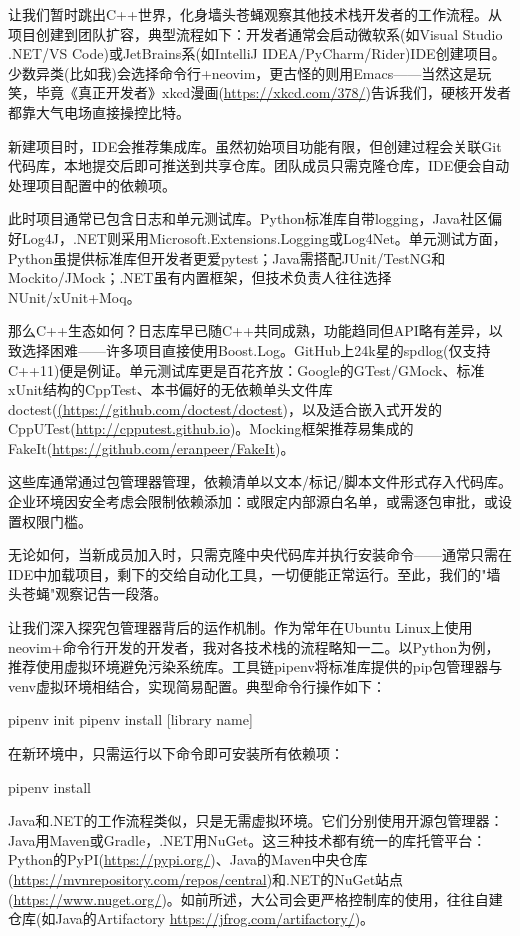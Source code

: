
让我们暂时跳出C++世界，化身墙头苍蝇观察其他技术栈开发者的工作流程。从项目创建到团队扩容，典型流程如下：开发者通常会启动微软系(如Visual Studio .NET/VS Code)或JetBrains系(如IntelliJ IDEA/PyCharm/Rider)IDE创建项目。少数异类(比如我)会选择命令行+neovim，更古怪的则用Emacs——当然这是玩笑，毕竟《真正开发者》xkcd漫画(\url{https://xkcd.com/378/})告诉我们，硬核开发者都靠大气电场直接操控比特。

新建项目时，IDE会推荐集成库。虽然初始项目功能有限，但创建过程会关联Git代码库，本地提交后即可推送到共享仓库。团队成员只需克隆仓库，IDE便会自动处理项目配置中的依赖项。

此时项目通常已包含日志和单元测试库。Python标准库自带logging，Java社区偏好Log4J，.NET则采用Microsoft.Extensions.Logging或Log4Net。单元测试方面，Python虽提供标准库但开发者更爱pytest；Java需搭配JUnit/TestNG和Mockito/JMock；.NET虽有内置框架，但技术负责人往往选择NUnit/xUnit+Moq。

那么C++生态如何？日志库早已随C++共同成熟，功能趋同但API略有差异，以致选择困难——许多项目直接使用Boost.Log。GitHub上24k星的spdlog(仅支持C++11)便是例证。单元测试库更是百花齐放：Google的GTest/GMock、标准xUnit结构的CppTest、本书偏好的无依赖单头文件库doctest(\url{(https://github.com/doctest/doctest})，以及适合嵌入式开发的CppUTest(\url{http://cpputest.github.io})。Mocking框架推荐易集成的FakeIt(\url{https://github.com/eranpeer/FakeIt})。

这些库通常通过包管理器管理，依赖清单以文本/标记/脚本文件形式存入代码库。企业环境因安全考虑会限制依赖添加：或限定内部源白名单，或需逐包审批，或设置权限门槛。

无论如何，当新成员加入时，只需克隆中央代码库并执行安装命令——通常只需在IDE中加载项目，剩下的交给自动化工具，一切便能正常运行。至此，我们的"墙头苍蝇"观察记告一段落。

让我们深入探究包管理器背后的运作机制。作为常年在Ubuntu Linux上使用neovim+命令行开发的开发者，我对各技术栈的流程略知一二。以Python为例，推荐使用虚拟环境避免污染系统库。工具链pipenv将标准库提供的pip包管理器与venv虚拟环境相结合，实现简易配置。典型命令行操作如下：

\begin{shell}
pipenv init
pipenv install [library name]
\end{shell}

在新环境中，只需运行以下命令即可安装所有依赖项：

\begin{shell}
pipenv install
\end{shell}

Java和.NET的工作流程类似，只是无需虚拟环境。它们分别使用开源包管理器：Java用Maven或Gradle，.NET用NuGet。这三种技术都有统一的库托管平台：Python的PyPI(\url{https://pypi.org/})、Java的Maven中央仓库(\url{https://mvnrepository.com/repos/central})和.NET的NuGet站点(\url{https://www.nuget.org/})。如前所述，大公司会更严格控制库的使用，往往自建仓库(如Java的Artifactory \url{https://jfrog.com/artifactory/})。

